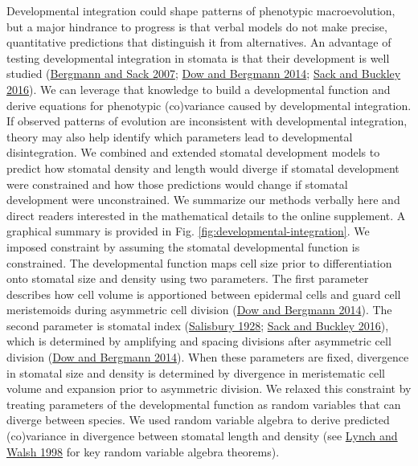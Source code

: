 \documentclass[
  12pt,
]{article}
\begin{document}
Developmental integration could shape patterns of phenotypic macroevolution, but a major hindrance to progress is that verbal models do not make precise, quantitative predictions that distinguish it from alternatives. An advantage of testing developmental integration in stomata is that their development is well studied (\protect\hyperlink{ref-bergmann_stomatal_2007}{Bergmann and Sack 2007}; \protect\hyperlink{ref-dow_patterning_2014}{Dow and Bergmann 2014}; \protect\hyperlink{ref-sack_developmental_2016}{Sack and Buckley 2016}). We can leverage that knowledge to build a developmental function and derive equations for phenotypic (co)variance caused by developmental integration. If observed patterns of evolution are inconsistent with developmental integration, theory may also help identify which parameters lead to developmental disintegration. We combined and extended stomatal development models to predict how stomatal density and length would diverge if stomatal development were constrained and how those predictions would change if stomatal development were unconstrained. We summarize our methods verbally here and direct readers interested in the mathematical details to the online supplement. A graphical summary is provided in Fig. \ref{fig:developmental-integration}. We imposed constraint by assuming the stomatal developmental function is constrained. The developmental function maps cell size prior to differentiation onto stomatal size and density using two parameters. The first parameter describes how cell volume is apportioned between epidermal cells and guard cell meristemoids during asymmetric cell division (\protect\hyperlink{ref-dow_patterning_2014}{Dow and Bergmann 2014}). The second parameter is stomatal index (\protect\hyperlink{ref-salisbury_i_1928}{Salisbury 1928}; \protect\hyperlink{ref-sack_developmental_2016}{Sack and Buckley 2016}), which is determined by amplifying and spacing divisions after asymmetric cell division (\protect\hyperlink{ref-dow_patterning_2014}{Dow and Bergmann 2014}). When these parameters are fixed, divergence in stomatal size and density is determined by divergence in meristematic cell volume and expansion prior to asymmetric division. We relaxed this constraint by treating parameters of the developmental function as random variables that can diverge between species. We used random variable algebra to derive predicted (co)variance in divergence between stomatal length and density (see \protect\hyperlink{ref-lynch_genetics_1998}{Lynch and Walsh 1998} for key random variable algebra theorems).
\end{document}
